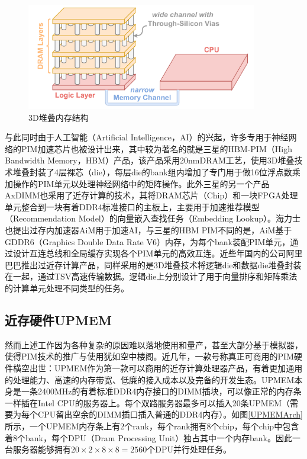 \begin{figure}[!htbp]
	\centering
    \includegraphics[width=0.9\textwidth]{figures/3DStack.pdf}
    \caption{3D堆叠内存结构}
	\label{3DStack}
\end{figure}

与此同时由于人工智能（Artificial Intelligence，AI）的兴起，许多专用于神经网络的PIM加速芯片也被设计出来，其中较为著名的就是三星的HBM-PIM（High Bandwidth Memory，HBM）产品\cite{SamsungHBMPIM}，该产品采用20nmDRAM工艺，使用3D堆叠技术堆叠封装了4层裸芯（die），每层die的bank组内增加了专门用于做16位浮点数乘加操作的PIM单元以处理神经网络中的矩阵操作。此外三星的另一个产品AxDIMM\cite{AxDIMM}也采用了近存计算的技术，其将DRAM芯片（Chip）和一块FPGA处理单元整合到一块有着DDR4标准接口的主板上，主要用于加速推荐模型（Recommendation Model）的向量嵌入查找任务（Embedding Lookup）。海力士也提出过存内加速器AiM\cite{AiM}用于加速AI，与三星的HBM PIM不同的是，AiM基于GDDR6（Graphics Double Data Rate V6）内存，为每个bank装配PIM单元，通过设计互连总线和全局缓存实现各个PIM单元的高效互连。近些年国内的公司阿里巴巴推出过近存计算产品\cite{AlibabaPIM}，同样采用的是3D堆叠技术将逻辑die和数据die堆叠封装在一起，通过TSV高速传输数据。逻辑die上分别设计了用于向量排序和矩阵乘法的计算单元处理不同类型的任务。

\subsection{近存硬件UPMEM}
然而上述工作因为各种复杂的原因难以落地使用和量产，甚至大部分基于模拟器，使得PIM技术的推广与使用犹如空中楼阁。近几年，一款号称真正可商用的PIM硬件横空出世：UPMEM作为第一款可以商用的近存计算处理器产品\cite{UPMEMHotChips}，有着更加通用的处理能力、高速的内存带宽、低廉的接入成本以及完备的开发生态。UPMEM本身是一条2400MHz的有着标准DDR4内存接口的DIMM插块，可以像正常的内存条一样插在Intel CPU的服务器上。每个双路服务器最多可以插入20条UPMEM（需要为每个CPU留出空余的DIMM插口插入普通的DDR4内存）。如图\ref{UPMEMArch}所示，一个UPMEM内存条上有2个rank，每个rank拥有8个chip，每个chip中包含着8个bank，每个DPU（Dram Processing Unit）独占其中一个内存bank。因此一台服务器能够拥有$20\times 2\times 8\times 8 = 2560$个DPU并行处理任务。

